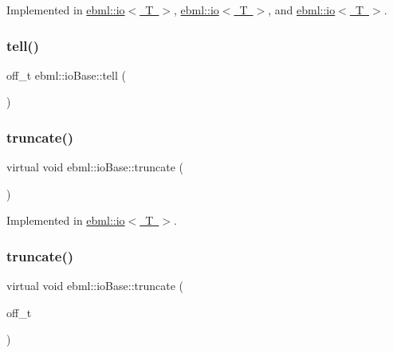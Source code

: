 Implemented in \mbox{\hyperlink{classebml_1_1io_ab019a4128b3339941124a12632c919fd}{ebml\+::io$<$ T $>$}}, \mbox{\hyperlink{classebml_1_1io_a4ea6caf18c5646646b3a15bc3c59a5ab}{ebml\+::io$<$ T $>$}}, and \mbox{\hyperlink{classebml_1_1io_a6e97c1e6868bf65286328b9447eaa419}{ebml\+::io$<$ T $>$}}.

\mbox{\label{classebml_1_1ioBase_af0911dd01f1bb6a7ab284770c178db59}} 
\subsubsection{\texorpdfstring{tell()}{tell()}}
{\footnotesize\ttfamily off\+\_\+t ebml\+::io\+Base\+::tell (\begin{DoxyParamCaption}{ }\end{DoxyParamCaption})}

\mbox{\label{classebml_1_1ioBase_a4cd6d91c2bb18a21c0fec425432b58c3}} 
\subsubsection{\texorpdfstring{truncate()}{truncate()}\hspace{0.1cm}{\footnotesize\ttfamily [1/2]}}
{\footnotesize\ttfamily virtual void ebml\+::io\+Base\+::truncate (\begin{DoxyParamCaption}{ }\end{DoxyParamCaption})\hspace{0.3cm}{\ttfamily [pure virtual]}}



Implemented in \mbox{\hyperlink{classebml_1_1io_a6a5c0f2182844094c6b4432a15adccc8}{ebml\+::io$<$ T $>$}}.

\mbox{\label{classebml_1_1ioBase_ae1a40372ba926becab957ae0b054492e}} 
\subsubsection{\texorpdfstring{truncate()}{truncate()}\hspace{0.1cm}{\footnotesize\ttfamily [2/2]}}
{\footnotesize\ttfamily virtual void ebml\+::io\+Base\+::truncate (\begin{DoxyParamCaption}\item[{off\+\_\+t}]{ }\end{DoxyParamCaption})\hspace{0.3cm}{\ttfamily [pure virtual]}}



